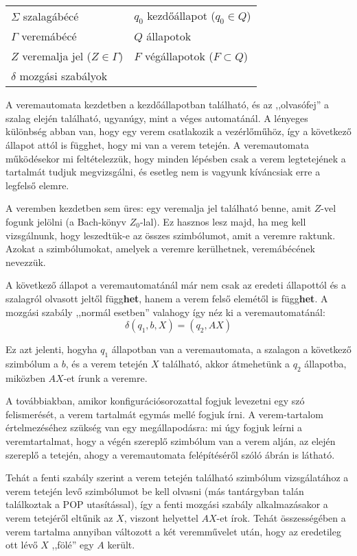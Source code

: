 \documentclass[a4paper]{article}
\begin{document}
\vspace{.6em}

\begin{tabular}{|*{2}{l|}}
\hline
$\Sigma$ szalagábécé&
$q_0$ kezdőállapot ($q_0 \in Q$)
\\
$\Gamma$ veremábécé &
$Q$ állapotok
\\
$Z$ veremalja jel  ($Z \in \Gamma$)&
$F$ végállapotok  ($F \subset Q$)\\
$\delta$ mozgási szabályok&
\\
\hline
\end{tabular}

\vspace{.6em}

A veremautomata kezdetben a kezdőállapotban található, és az
,,olvasófej'' a szalag elején található, ugyanúgy, mint a véges
automatánál. A lényeges különbség abban van, hogy egy verem csatlakozik
a vezérlőműhöz, így a következő állapot attól is függhet, hogy mi van a
verem tetején. A veremautomata működésekor mi feltételezzük, hogy
minden lépésben csak a verem legtetejének a tartalmát tudjuk
megvizsgálni, és esetleg nem is vagyunk kíváncsiak erre a legfelső
elemre.

A veremben kezdetben sem üres: egy veremalja jel található benne, amit
$Z$-vel fogunk jelölni (a Bach-könyv $Z_0$-lal). Ez hasznos lesz majd,
ha meg kell vizsgálnunk, hogy leszedtük-e az összes szimbólumot, amit a
veremre raktunk. Azokat a szimbólumokat, amelyek a veremre kerülhetnek,
veremábécének nevezzük.

A következő állapot a veremautomatánál már nem csak az eredeti
állapottól és a szalagról olvasott jeltől függ\textbf{het}, hanem a
verem felső elemétől is függ\textbf{het}. A mozgási szabály ,,normál
esetben'' valahogy így néz ki a veremautomatánál:
\[\delta(q_1, b, X) = (q_2, AX)\]

Ez azt jelenti, hogyha $q_1$ állapotban van a veremautomata, a szalagon
a következő szimbólum a $b$, és a verem tetején $X$ található, akkor
átmehetünk a $q_2$ állapotba, miközben $AX$-et írunk a veremre.

A továbbiakban, amikor konfigurációsorozattal fogjuk levezetni egy szó
felismerését, a verem tartalmát egymás mellé fogjuk írni. A
verem-tartalom értelmezéséhez szükség van egy megállapodásra: mi úgy
fogjuk leírni a veremtartalmat, hogy a végén szereplő szimbólum van a
verem alján, az elején szereplő a tetején, ahogy a veremautomata
felépítéséről szóló ábrán is látható.

Tehát a fenti szabály szerint a verem tetején található szimbólum
vizsgálatához a verem tetején levő szimbólumot be kell olvasni (más
tantárgyban talán találkoztak a POP utasítással), így a fenti mozgási
szabály alkalmazásakor a verem tetejéről eltűnik az $X$, viszont
helyettel $AX$-et írok. Tehát összességében a verem tartalma annyiban
változott a két veremművelet után, hogy az eredetileg ott lévő $X$
,,fölé'' egy $A$ került.
\end{document}
